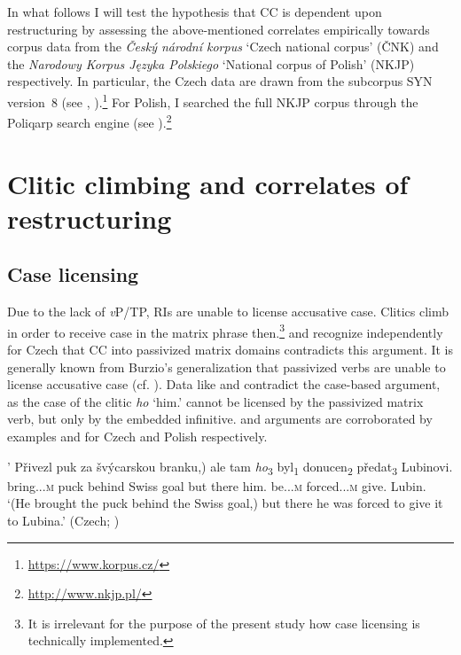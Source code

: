 \documentclass[output=paper,colorlinks,citecolor=brown]{langscibook}
\begin{document}
In what follows I will test the hypothesis that CC is dependent upon restructuring by assessing the above-mentioned correlates empirically towards corpus data from the \textit{Český národní korpus} ‘Czech national corpus’ (ČNK) and the \textit{Narodowy Korpus Języka Polskiego} ‘National corpus of Polish’ (NKJP) respectively. In particular, the Czech data are drawn from the subcorpus SYN version~8 (see \citealt{KřenZasina2019}, \citealt{HnátkováSkoumalová2014}).\footnote{\url{https://www.korpus.cz/}} For Polish, I searched the full NKJP corpus through the Poliqarp search engine (see \citealt{PrzepiórkowskiLewandowska-Tomaszczyk2012}).\footnote{\url{http://www.nkjp.pl/}}

\section{Clitic climbing and correlates of restructuring}\label{kul:sec:climbing-restructure}

\subsection{Case licensing}\label{kul:sec:case-licensing}

Due to the lack of \textit{v}P/TP, RIs are unable to license accusative case. Clitics climb in order to receive case in the matrix phrase then.\footnote{It is irrelevant for the purpose of the present study how case licensing is technically implemented.} \citet{Lenertova2004} and \citet{Dotlačil2004} recognize independently for Czech that CC into passivized matrix domains contradicts this argument. It is generally known from Burzio’s generalization that passivized verbs are unable to license accusative case (cf. \citealt{Burzio1986}). Data like  and  contradict the case-based argument, as the case of the clitic \textit{ho} ‘him.{\ACC}’ cannot be licensed by the passivized matrix verb, but only by the embedded infinitive.  and  arguments are corroborated by examples  and  for Czech and Polish respectively.

\ea\label{kul:ex:privezl-puk}
\gll '\minsp{(} Přivezl puk za švýcarskou branku,) ale tam \textit{ho}\textsubscript{3} byl\textsubscript{1} donucen\textsubscript{2} předat\textsubscript{3} Lubinovi.\\
{} bring.{\PST.\SG.}\textsc{m} puck behind Swiss goal but there him.{\ACC} be.{\PST.\SG.}\textsc{m} forced.{\PASS.\SG.}\textsc{m} give.{\INF} Lubin.{\DAT}\\
\glt `(He brought the puck behind the Swiss goal,) but there he was forced to give it to Lubina.’ \hfill (Czech; \citealt[159]{Lenertova2004})
\z
\end{document}
